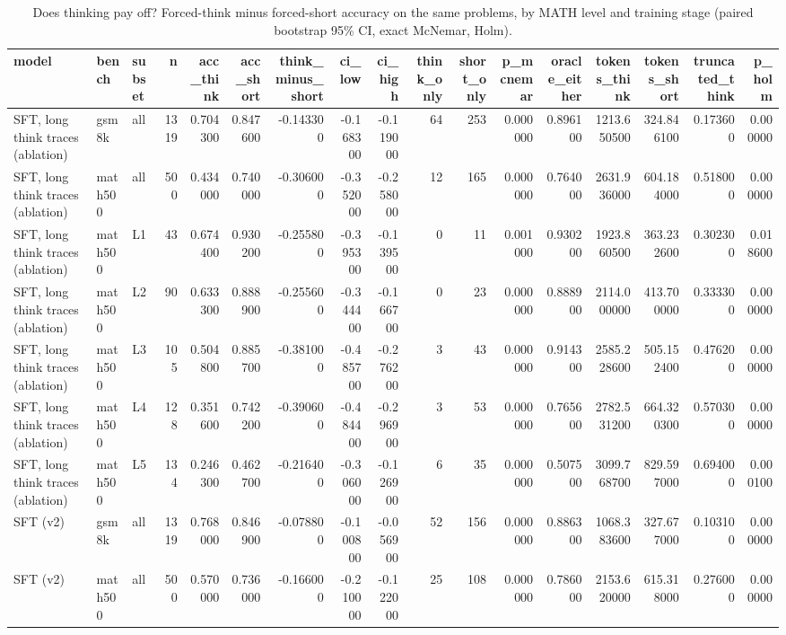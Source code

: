\begin{table}
\caption{Does thinking pay off? Forced-think minus forced-short accuracy on the same problems, by MATH level and training stage (paired bootstrap 95\% CI, exact McNemar, Holm).}
\label{tab:think_vs_short}
\begin{tabular}{lllrrrrrrrrrrrrrr}
\toprule
model & bench & subset & n & acc_think & acc_short & think_minus_short & ci_low & ci_high & think_only & short_only & p_mcnemar & oracle_either & tokens_think & tokens_short & truncated_think & p_holm \\
\midrule
SFT, long think traces (ablation) & gsm8k & all & 1319 & 0.704300 & 0.847600 & -0.143300 & -0.168300 & -0.119000 & 64 & 253 & 0.000000 & 0.896100 & 1213.650500 & 324.846100 & 0.173600 & 0.000000 \\
SFT, long think traces (ablation) & math500 & all & 500 & 0.434000 & 0.740000 & -0.306000 & -0.352000 & -0.258000 & 12 & 165 & 0.000000 & 0.764000 & 2631.936000 & 604.184000 & 0.518000 & 0.000000 \\
SFT, long think traces (ablation) & math500 & L1 & 43 & 0.674400 & 0.930200 & -0.255800 & -0.395300 & -0.139500 & 0 & 11 & 0.001000 & 0.930200 & 1923.860500 & 363.232600 & 0.302300 & 0.018600 \\
SFT, long think traces (ablation) & math500 & L2 & 90 & 0.633300 & 0.888900 & -0.255600 & -0.344400 & -0.166700 & 0 & 23 & 0.000000 & 0.888900 & 2114.000000 & 413.700000 & 0.333300 & 0.000000 \\
SFT, long think traces (ablation) & math500 & L3 & 105 & 0.504800 & 0.885700 & -0.381000 & -0.485700 & -0.276200 & 3 & 43 & 0.000000 & 0.914300 & 2585.228600 & 505.152400 & 0.476200 & 0.000000 \\
SFT, long think traces (ablation) & math500 & L4 & 128 & 0.351600 & 0.742200 & -0.390600 & -0.484400 & -0.296900 & 3 & 53 & 0.000000 & 0.765600 & 2782.531200 & 664.320300 & 0.570300 & 0.000000 \\
SFT, long think traces (ablation) & math500 & L5 & 134 & 0.246300 & 0.462700 & -0.216400 & -0.306000 & -0.126900 & 6 & 35 & 0.000000 & 0.507500 & 3099.768700 & 829.597000 & 0.694000 & 0.000100 \\
SFT (v2) & gsm8k & all & 1319 & 0.768000 & 0.846900 & -0.078800 & -0.100800 & -0.056900 & 52 & 156 & 0.000000 & 0.886300 & 1068.383600 & 327.677000 & 0.103100 & 0.000000 \\
SFT (v2) & math500 & all & 500 & 0.570000 & 0.736000 & -0.166000 & -0.210000 & -0.122000 & 25 & 108 & 0.000000 & 0.786000 & 2153.620000 & 615.318000 & 0.276000 & 0.000000 \\

\end{tabular}
\end{table}
